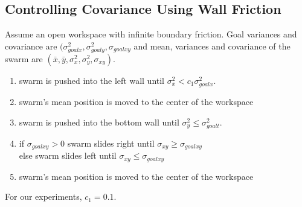 \subsection{Controlling Covariance Using Wall Friction}\label{subsec:ClosedLoopCovarianceControl}
Assume an open workspace with infinite boundary friction. Goal variances and covariance are  $(\sigma_{goalx}^2,\sigma_{goaly}^2, \sigma_{goalxy}$ and mean, variances and covariance of the swarm  are $( \bar{x},\bar{y},\sigma_x^2,\sigma_y^2, \sigma_{xy})$. 
\begin{enumerate}
\item swarm is pushed into the left wall until $\sigma_x^2< c_1\sigma_{goalx}^2$.  
\item swarm's mean position is moved to the center of the workspace
\item swarm is pushed into the bottom wall until $\sigma_y^2 \le \sigma_{goalt}^2$. 
\item if $\sigma_{goalxy}>0$ swarm slides right until $\sigma_{xy} \ge \sigma_{goalxy}$ \\
else swarm slides left until $\sigma_{xy} \le \sigma_{goalxy}$ 
\item  swarm's mean position is moved to the center of the workspace
\end{enumerate}
For our experiments, $c_1 = 0.1$.


